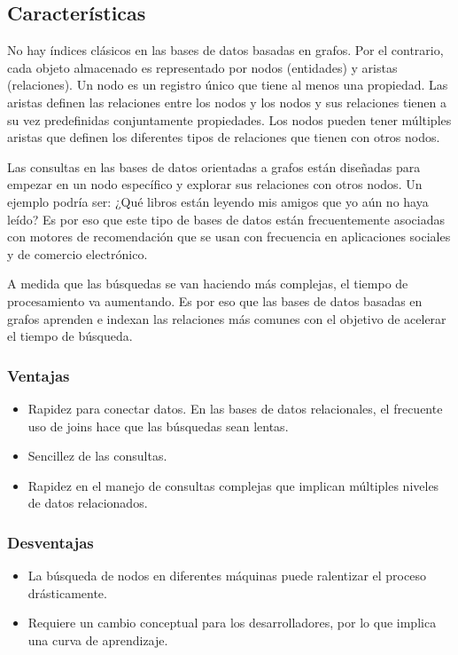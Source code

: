 	\subsection{Características}
		No hay índices clásicos en las bases de datos basadas en grafos. Por el contrario, cada objeto almacenado es representado por nodos (entidades) y aristas (relaciones). Un nodo es un registro único que tiene al menos una propiedad. Las aristas definen las relaciones entre los nodos y los nodos y sus relaciones tienen a su vez predefinidas conjuntamente propiedades. Los nodos pueden tener múltiples aristas que definen los diferentes tipos de relaciones que tienen con otros nodos.

		Las consultas en las bases de datos orientadas a grafos están diseñadas para empezar en un nodo específico y explorar sus relaciones con otros nodos. Un ejemplo podría ser: ¿Qué libros están leyendo mis amigos que yo aún no haya leído? Es por eso que este tipo de bases de datos están frecuentemente asociadas con motores de recomendación que se usan con frecuencia en aplicaciones sociales y de comercio electrónico.

		A medida que las búsquedas se van haciendo más complejas, el tiempo de procesamiento va aumentando. Es por eso que las bases de datos basadas en grafos aprenden e indexan las relaciones más comunes con el objetivo de acelerar el tiempo de búsqueda. 
		\subsubsection{Ventajas}
		\begin{itemize}
		 \item Rapidez para conectar datos. En las bases de datos relacionales, el frecuente uso de joins hace que las búsquedas sean lentas.
		 \item Sencillez de las consultas.
		 \item Rapidez en el manejo de consultas complejas que implican múltiples niveles de datos relacionados.
		\end{itemize}
		\subsubsection{Desventajas}
		\begin{itemize}
		 \item La búsqueda de nodos en diferentes máquinas puede ralentizar el proceso drásticamente.
		 \item Requiere un cambio conceptual para los desarrolladores, por lo que implica una curva de aprendizaje.
		\end{itemize}\cite{9}


